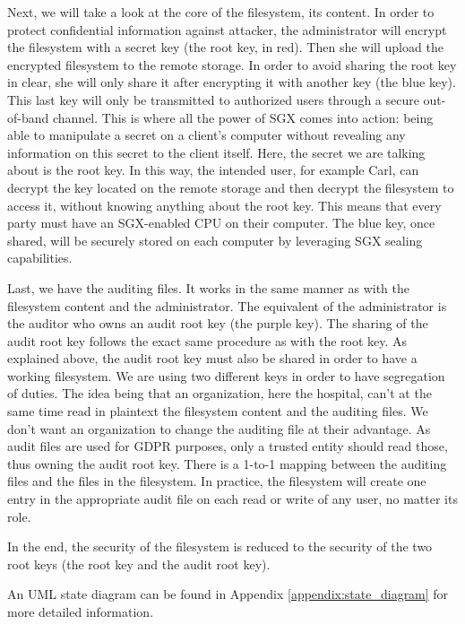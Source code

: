 \documentclass[../main.tex]{subfiles}
\begin{document}
\par Next, we will take a look at the core of the filesystem, its content. In order to protect confidential information against attacker, the administrator will encrypt the filesystem with a secret key (the root key, in red). Then she will upload the encrypted filesystem to the remote storage. In order to avoid sharing the root key in clear, she will only share it after encrypting it with another key (the blue key). This last key will only be transmitted to authorized users through a secure out-of-band channel. This is where all the power of SGX comes into action: being able to manipulate a secret on a client's computer without revealing any information on this secret to the client itself. Here, the secret we are talking about is the root key. In this way, the intended user, for example Carl, can decrypt the key located on the remote storage and then decrypt the filesystem to access it, without knowing anything about the root key. This means that every party must have an SGX-enabled CPU on their computer. The blue key, once shared, will be securely stored on each computer by leveraging SGX sealing capabilities.\\

\par Last, we have the auditing files. It works in the same manner as with the filesystem content and the administrator. The equivalent of the administrator is the auditor who owns an audit root key (the purple key). The sharing of the audit root key follows the exact same procedure as with the root key. As explained above, the audit root key must also be shared in order to have a working filesystem. We are using two different keys in order to have segregation of duties. The idea being that an organization, here the hospital, can't at the same time read in plaintext the filesystem content and the auditing files. We don't want an organization to change the auditing file at their advantage. As audit files are used for GDPR purposes, only a trusted entity should read those, thus owning the audit root key. There is a 1-to-1 mapping between the auditing files and the files in the filesystem. In practice, the filesystem will create one entry in the appropriate audit file on each read or write of any user, no matter its role.

\par In the end, the security of the filesystem is reduced to the security of the two root keys (the root key and the audit root key).
\par An UML state diagram can be found in Appendix \ref{appendix:state_diagram} for more detailed information.
\end{document}
